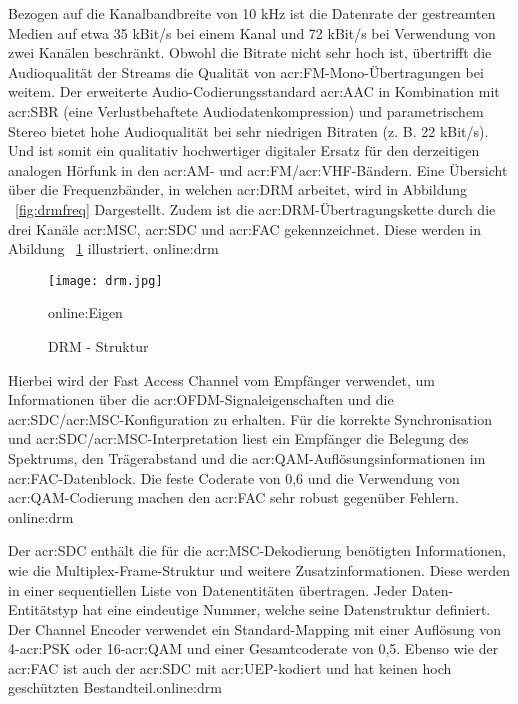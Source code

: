 Bezogen auf die Kanalbandbreite von 10 kHz ist die Datenrate der gestreamten Medien auf etwa 35 kBit/s bei einem Kanal und 72 kBit/s bei Verwendung von zwei Kanälen beschränkt. Obwohl die Bitrate nicht sehr hoch ist, übertrifft die Audioqualität der Streams die Qualität von \gls{acr:FM}-Mono-Übertragungen bei weitem. Der erweiterte Audio-Codierungsstandard \gls{acr:AAC} in Kombination mit \gls{acr:SBR} (eine Verlustbehaftete Audiodatenkompression) und parametrischem Stereo bietet hohe Audioqualität bei sehr niedrigen Bitraten (z. B. 22 kBit/s). Und ist somit ein qualitativ hochwertiger digitaler Ersatz für den derzeitigen analogen Hörfunk in den \gls{acr:AM}- und \gls{acr:FM}/\gls{acr:VHF}-Bändern. Eine Übersicht über die Frequenzbänder, in welchen \gls{acr:DRM} arbeitet, wird in Abbildung ~\ref{fig:drmfreq} Dargestellt. Zudem ist die \gls{acr:DRM}-Übertragungskette durch die drei Kanäle \gls{acr:MSC}, \gls{acr:SDC} und \gls{acr:FAC} gekennzeichnet. Diese werden in Abildung ~\ref{fig:drm} illustriert. \gls{online:drm}

\begin{figure}[H]
	\centering
	\texttt{[image: drm.jpg]}
	\caption[DRM - Struktur]{DRM - Struktur} 
	\gls{online:Eigen}
	\label{fig:drm}
\end{figure}


Hierbei wird der Fast Access Channel vom Empfänger verwendet, um Informationen über die \gls{acr:OFDM}-Signaleigenschaften und die \gls{acr:SDC}/\gls{acr:MSC}-Konfiguration zu erhalten. Für die korrekte Synchronisation und \gls{acr:SDC}/\gls{acr:MSC}-Interpretation liest ein Empfänger die Belegung des Spektrums, den Trägerabstand und die \gls{acr:QAM}-Auflösungsinformationen im \gls{acr:FAC}-Datenblock. Die feste Coderate von 0,6 und die Verwendung von \gls{acr:QAM}-Codierung machen den \gls{acr:FAC} sehr robust gegenüber Fehlern. \gls{online:drm}

Der \gls{acr:SDC} enthält die für die \gls{acr:MSC}-Dekodierung benötigten Informationen, wie die Multiplex-Frame-Struktur und weitere Zusatzinformationen. Diese werden in einer sequentiellen Liste von Datenentitäten übertragen. Jeder Daten-Entitätstyp hat eine eindeutige Nummer, welche seine Datenstruktur definiert. Der Channel Encoder verwendet ein Standard-Mapping mit einer Auflösung von 4-\gls{acr:PSK} oder 16-\gls{acr:QAM} und einer Gesamtcoderate von 0,5. Ebenso wie der \gls{acr:FAC} ist auch der \gls{acr:SDC} mit  \gls{acr:UEP}-kodiert und hat keinen hoch geschützten Bestandteil.\gls{online:drm}

